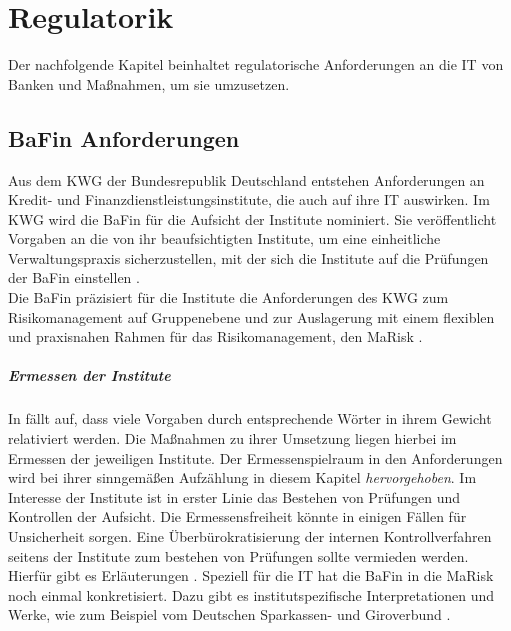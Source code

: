 \chapter{Regulatorik}
\label{ch:background}
Der nachfolgende Kapitel beinhaltet regulatorische Anforderungen an die IT von Banken und Maßnahmen, um sie umzusetzen.
%

\section{BaFin Anforderungen}
Aus dem \ac{KWG} der Bundesrepublik Deutschland entstehen Anforderungen an Kredit- und Finanzdienstleistungsinstitute, die auch auf ihre IT auswirken. Im \ac{KWG} wird die BaFin für die Aufsicht der Institute nominiert. Sie veröffentlicht Vorgaben an die von ihr beaufsichtigten Institute, um eine einheitliche Verwaltungspraxis sicherzustellen, mit der sich die Institute auf die Prüfungen der BaFin einstellen \cite{BaFin:Verwaltungspraxis}. 
\medskip
\\
Die BaFin präzisiert für die Institute die Anforderungen des \ac{KWG} zum Risikomanagement auf Gruppenebene und zur Auslagerung mit einem flexiblen und praxisnahen Rahmen für das Risikomanagement, den \ac{MaRisk} \cite{MaRisk:2017}.

\paragraph{Ermessen der Institute}
In \cite{MaRisk:2017, BAIT:2018} fällt auf, dass viele Vorgaben durch entsprechende Wörter in ihrem Gewicht relativiert werden. Die Maßnahmen zu ihrer Umsetzung liegen hierbei im Ermessen der jeweiligen Institute. Der Ermessenspielraum in den Anforderungen wird bei ihrer sinngemäßen Aufzählung in diesem Kapitel \emph{hervorgehoben}. Im Interesse der Institute ist in erster Linie das Bestehen von Prüfungen und Kontrollen der Aufsicht. Die Ermessensfreiheit könnte in einigen Fällen für Unsicherheit sorgen. Eine Überbürokratisierung der internen Kontrollverfahren seitens der Institute zum bestehen von Prüfungen sollte vermieden werden. Hierfür gibt es Erläuterungen \cite{MaRiskErläuterungen:2017}. Speziell für die IT hat die BaFin in \cite{BAIT:2018} die \ac{MaRisk} noch einmal konkretisiert. Dazu gibt es institutspezifische Interpretationen und Werke, wie zum Beispiel vom Deutschen Sparkassen- und Giroverbund \cite{DSGV:2019}.
%

